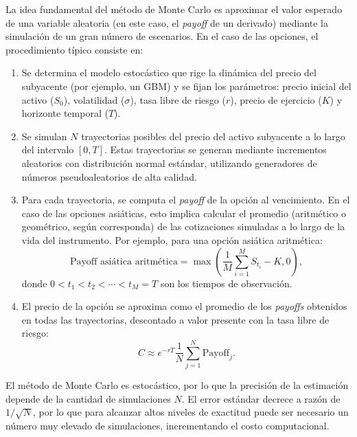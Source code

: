 \documentclass[11pt,a4paper,spanish]{article}
\numberwithin{equation}{section} %
\begin{document}
La idea fundamental del método de Monte Carlo es aproximar el valor esperado de una variable aleatoria (en este caso, el \textit{payoff} de un derivado) mediante la simulación de un gran número de escenarios. En el caso de las opciones, el procedimiento típico consiste en:

\begin{enumerate}
    \item Se determina el modelo estocástico que rige la dinámica del precio del subyacente (por ejemplo, un GBM) y se fijan los parámetros: precio inicial del activo ($S_0$), volatilidad ($\sigma$), tasa libre de riesgo ($r$), precio de ejercicio ($K$) y horizonte temporal ($T$).

    \item Se simulan $N$ trayectorias posibles del precio del activo subyacente a lo largo del intervalo $[0,T]$. Estas trayectorias se generan mediante incrementos aleatorios con distribución normal estándar, utilizando generadores de números pseudoaleatorios de alta calidad.

    \item Para cada trayectoria, se computa el \textit{payoff} de la opción al vencimiento. En el caso de las opciones asiáticas, esto implica calcular el promedio (aritmético o geométrico, según corresponda) de las cotizaciones simuladas a lo largo de la vida del instrumento. Por ejemplo, para una opción asiática aritmética:
    \begin{equation}
    \text{Payoff asiática aritmética} = \max\left( \frac{1}{M}\sum_{i=1}^{M} S_{t_i} - K, 0 \right),
    \end{equation}
    donde $0 < t_1 < t_2 < \cdots < t_M = T$ son los tiempos de observación.

    \item El precio de la opción se aproxima como el promedio de los \textit{payoffs} obtenidos en todas las trayectorias, descontado a valor presente con la tasa libre de riesgo:
    \begin{equation}
    C \approx e^{-rT}\frac{1}{N}\sum_{j=1}^{N}\text{Payoff}_j.
    \end{equation}
\end{enumerate}

    El método de Monte Carlo es estocástico, por lo que la precisión de la estimación depende de la cantidad de simulaciones $N$. El error estándar decrece a razón de $1/\sqrt{N}$, por lo que para alcanzar altos niveles de exactitud puede ser necesario un número muy elevado de simulaciones, incrementando el costo computacional.
\end{document}
